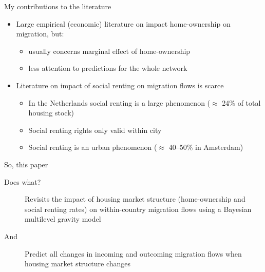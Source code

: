 \documentclass{beamer}
\begin{document}
\begin{frame}{My contributions to the literature}
  \begin{itemize}
  \item Large empirical (economic) literature on impact home-ownership on migration, but:
    \begin{itemize}
    \item usually concerns \alert{marginal} effect of home-ownership
    \item less attention to \alert{predictions} for the whole network\newline
    \end{itemize}
  \item Literature on impact of social renting on migration flows is
    scarce \citep{de2009homeownership}
	\begin{itemize}
        \item In the Netherlands social renting is a large phenomenon
          ($\approx$ 24\% of total housing stock)
        \item Social renting rights only valid \alert{within} city
          \citep{boyle1998migration}
        \item Social renting is an \alert{urban} phenomenon ($\approx$
          40--50\% in Amsterdam) 
        \end{itemize}
\end{itemize}
\end{frame}

\begin{frame}{So, this paper}
  \begin{description}
  \item[Does what?] \alert{Revisits} the impact of housing market
    structure (home-ownership and social renting rates) on within-country
    migration flows using a Bayesian multilevel gravity model
    \citep{congdon2010random} \newline
  \item[And] \alert{Predict} all changes in incoming and
    outcoming migration flows when housing market structure changes
\end{description}
\end{frame}
\end{document}
